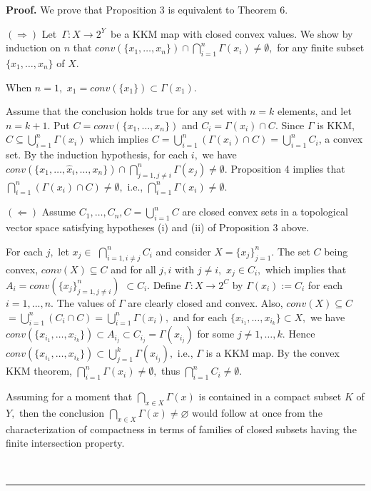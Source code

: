 \documentclass{article}
\newenvironment{proof}[1][Proof]{\noindent\textbf{#1.} }{\ \rule{0.5em}{0.5em}}
\begin{document}
\begin{proof}
We prove that Proposition 3 is equivalent to Theorem 6.

$(\Longrightarrow )$ Let\textit{\ }$\Gamma :X\longrightarrow 2^{Y}$\ be a
KKM map with closed convex values. We show by induction on $n$ that $%
conv(\{x_{1},\ldots ,x_{n}\})\cap \bigcap_{i=1}^{n}\Gamma (x_{i})\neq
\emptyset ,$ for any finite subset $\{x_{1},\ldots ,x_{n}\}$ of $X.$

When $n=1,$ $x_{1}=conv(\{x_{1}\})\subset \Gamma (x_{1}).$

Assume that the conclusion holds true for any set with $n=k$ elements, and
let $n=k+1.$ Put $C=conv(\{x_{1},\ldots ,x_{n}\})$ and $C_{i}=\Gamma
(x_{i})\cap C.$ Since $\Gamma $ is KKM, $C\subseteq \bigcup_{i=1}^{n}\Gamma
(x_{i})$ which implies $C=\bigcup_{i=1}^{n}(\Gamma (x_{i})\cap
C)=\bigcup_{i=1}^{n}C_{i}$, a convex set. By the induction hypothesis, for
each $i,$ we have $conv(\{x_{1},\ldots ,\hat{x}_{i},\ldots ,x_{n}\})\cap
\bigcap_{j=1,j\neq i}^{n}\Gamma (x_{j})\neq \emptyset .$ Proposition 4
implies that $\bigcap_{i=1}^{n}(\Gamma (x_{i})\cap C)\neq \emptyset ,$ i.e., 
$\bigcap_{i=1}^{n}\Gamma (x_{i})\neq \emptyset $.\bigskip

$(\Longleftarrow )$ Assume $C_{1},\ldots ,C_{n},C=\bigcup_{i=1}^{n}C$ are
closed convex sets in a topological vector space satisfying hypotheses (i)
and (ii) of Proposition 3 above.

For each $j,$ let $x_{j}\in $ $\bigcap\nolimits_{i=1,i\neq j}^{n}C_{i}$ and
consider $X=\{x_{j}\}_{j=1}^{n}.$ The set $C$ being convex, $%
conv(X)\subseteq C$ and for all $j,i$ with $j\neq i,$ $x_{j}\in C_{i},$
which implies that $A_{i}=conv(\{x_{j}\}_{j=1,j\neq i}^{n})$ $\subset C_{i}.$
Define $\Gamma :X\longrightarrow 2^{C}$ by $\Gamma (x_{i}):=C_{i}$ for each $%
i=1,...,n.$ The values of $\Gamma $ are clearly closed and convex. Also, $%
conv(X)\subseteq C$ $=\bigcup_{i=1}^{n}(C_{i}\cap C)=\bigcup_{i=1}^{n}\Gamma
(x_{i}),$ and for each $\{x_{i_{1}},\ldots ,x_{i_{k}}\}\subset X,$ we have $%
conv(\{x_{i_{1}},\ldots ,x_{i_{k}}\})\subset A_{i_{j}}\subset
C_{i_{j}}=\Gamma (x_{i_{j}})$ for some $j\neq 1,\ldots ,k.$ Hence $%
conv(\{x_{i_{1}},\ldots ,x_{i_{k}}\})\subset \bigcup_{j=1}^{k}\Gamma
(x_{i_{j}}),$ i.e., $\Gamma $ is a KKM map. By the convex KKM theorem, $%
\bigcap_{i=1}^{n}\Gamma (x_{i})\neq \emptyset ,$ thus $%
\bigcap_{i=1}^{n}C_{i}\neq \emptyset .$

Assuming for a moment that $\bigcap_{x\in X}\Gamma (x)$ is contained in a
compact subset $K$ of $Y,$ then the conclusion $\bigcap_{x\in X}\Gamma
(x)\neq \varnothing $ would follow at once from the characterization of
compactness in terms of families of closed subsets having the finite
intersection property.


\end{proof}
\end{document}
